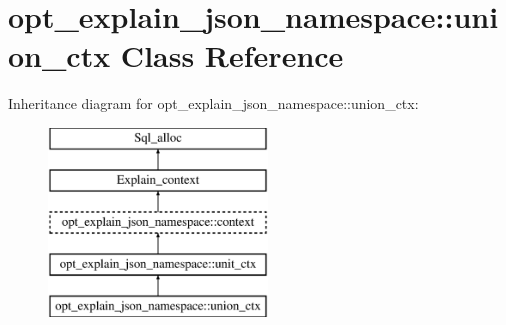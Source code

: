 \hypertarget{classopt__explain__json__namespace_1_1union__ctx}{}\section{opt\+\_\+explain\+\_\+json\+\_\+namespace\+:\+:union\+\_\+ctx Class Reference}
\label{classopt__explain__json__namespace_1_1union__ctx}
Inheritance diagram for opt\+\_\+explain\+\_\+json\+\_\+namespace\+:\+:union\+\_\+ctx\+:\begin{figure}[H]
\begin{center}
\leavevmode
\includegraphics[height=5.000000cm]{classopt__explain__json__namespace_1_1union__ctx}
\end{center}
\end{figure}
